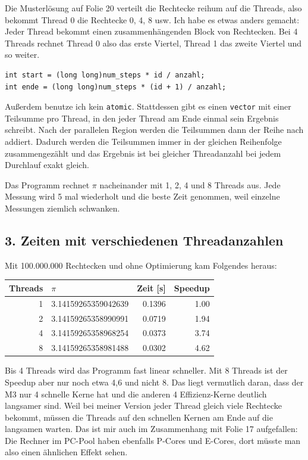 \documentclass[11pt]{article}
\begin{document}
Die Musterlösung auf Folie 20 verteilt die Rechtecke reihum auf die Threads, also bekommt Thread 0
die Rechtecke 0, 4, 8 usw. Ich habe es etwas anders gemacht: Jeder Thread bekommt einen
zusammenhängenden Block von Rechtecken. Bei 4 Threads rechnet Thread 0 also das erste Viertel,
Thread 1 das zweite Viertel und so weiter.
\begin{verbatim}
int start = (long long)num_steps * id / anzahl;
int ende = (long long)num_steps * (id + 1) / anzahl;
\end{verbatim}
Außerdem benutze ich kein \texttt{atomic}. Stattdessen gibt es einen \texttt{vector} mit einer
Teilsumme pro Thread, in den jeder Thread am Ende einmal sein Ergebnis schreibt. Nach der parallelen
Region werden die Teilsummen dann der Reihe nach addiert. Dadurch werden die Teilsummen immer in
der gleichen Reihenfolge zusammengezählt und das Ergebnis ist bei gleicher Threadanzahl bei jedem
Durchlauf exakt gleich.

Das Programm rechnet $\pi$ nacheinander mit 1, 2, 4 und 8 Threads aus. Jede Messung wird 5 mal
wiederholt und die beste Zeit genommen, weil einzelne Messungen ziemlich schwanken.

\subsection*{3. Zeiten mit verschiedenen Threadanzahlen}

Mit 100.000.000 Rechtecken und ohne Optimierung kam Folgendes heraus:

\begin{center}
\begin{tabular}{rlrr}
Threads & $\pi$ & Zeit [s] & Speedup \\
\hline
1 & 3.14159265359042639 & 0.1396 & 1.00 \\
2 & 3.14159265358990991 & 0.0719 & 1.94 \\
4 & 3.14159265358968254 & 0.0373 & 3.74 \\
8 & 3.14159265358981488 & 0.0302 & 4.62 \\
\end{tabular}
\end{center}

Bis 4 Threads wird das Programm fast linear schneller. Mit 8 Threads ist der Speedup aber nur
noch etwa 4,6 und nicht 8. Das liegt vermutlich daran, dass der M3 nur 4 schnelle Kerne hat und
die anderen 4 Effizienz-Kerne deutlich langsamer sind. Weil bei meiner Version jeder Thread gleich
viele Rechtecke bekommt, müssen die Threads auf den schnellen Kernen am Ende auf die langsamen
warten. Das ist mir auch im Zusammenhang mit Folie 17 aufgefallen: Die Rechner im PC-Pool haben
ebenfalls P-Cores und E-Cores, dort müsste man also einen ähnlichen Effekt sehen.
\end{document}

